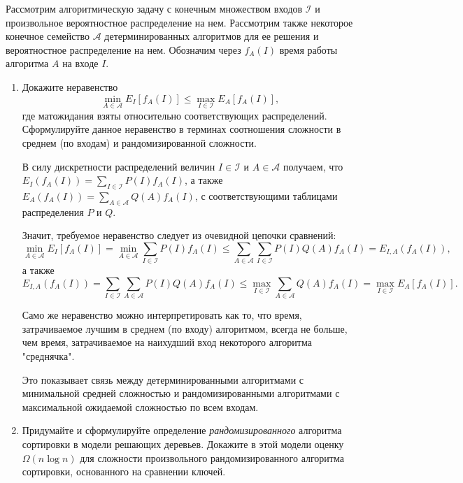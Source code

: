 \documentclass[11pt]{article}
\renewcommand{\le}{\leqslant}   %
\begin{document}
\begin{problem}{30}
Рассмотрим алгоритмическую задачу с конечным множеством входов $\mathcal{I}$ и произвольное вероятностное распределение на нем. Рассмотрим также некоторое конечное семейство $\mathcal{A}$ детерминированных алгоритмов для ее решения
и вероятностное распределение на нем. Обозначим через $f_A(I)$ время работы алгоритма
$A$ на входе $I$.

\begin{enumerate}
	\item Докажите неравенство
	      $$
		      \min_{A \in \mathcal{A}} E_I\left[ f_A(I) \right] \le \max_{I \in \mathcal{I}} E_A\left[ f_A(I) \right],
	      $$
	      где матожидания взяты относительно соответствующих распределений.
	      Сформулируйте данное неравенство в терминах соотношения сложности в среднем (по входам) и рандомизированной сложности.

	      \begin{solution}
		      В силу дискретности распределений величин $I \in \mathcal{I} $ и $A \in \mathcal{A} $ получаем, что $ E_I(f_A(I)) = \sum_{I \in \mathcal{I}} P(I) f_A(I) $, а также $ E_A(f_A(I)) = \sum_{A \in \mathcal{A}} Q(A) f_A(I) $, с соответствующими таблицами распределения $ P $ и $ Q $.

		      Значит, требуемое неравенство следует из очевидной цепочки сравнений:
		      $$
			      \min_{A \in \mathcal{A}} E_I\left[ f_A(I) \right] = \min_{A \in \mathcal{A}} \sum_{I \in \mathcal{I}} P(I) f_A(I) \le \sum_{A \in \mathcal{A}} \sum_{I \in \mathcal{I}} P(I) Q(A) f_A(I) = E_{I, A}(f_A(I)),
		      $$
		      а также
		      $$
			      E_{I, A}(f_A(I)) = \sum_{I \in \mathcal{I}} \sum_{A \in \mathcal{A}} P(I) Q(A) f_A(I) \le \max_{I \in \mathcal{I}} \sum_{A \in \mathcal{A}} Q(A) f_A(I) = \max_{I \in \mathcal{I}} E_A\left[ f_A(I) \right].
		      $$

		      Само же неравенство можно интерпретировать как то, что время, затрачиваемое лучшим в среднем (по входу) алгоритмом, всегда не больше, чем время, затрачиваемое на наихудший вход некоторого алгоритма "среднячка".

		      Это показывает связь между детерминированными алгоритмами с минимальной средней сложностью и рандомизированными алгоритмами с максимальной ожидаемой сложностью по всем входам.
	      \end{solution}

	\item Придумайте и сформулируйте определение \emph{рандомизированного} алгоритма сортировки в модели решающих деревьев.
	Докажите в этой модели оценку $\Omega(n \log n)$ для сложности произвольного рандомизированного      алгоритма сортировки, основанного на сравнении ключей.


\end{enumerate}
\end{problem}
\end{document}
